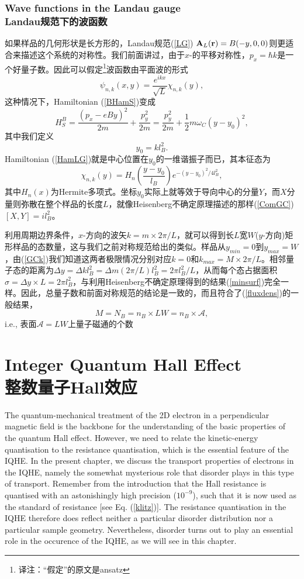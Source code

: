 \documentclass[10pt]{book}
\newcommand{\br}{{\bf r}}
\newcommand{\bA}{{\bf A}}
\newcommand{\Amath}{\mathcal{A}}
\newcommand{\beq}{\begin{equation}}
\newcommand{\eeq}{\end{equation}}
\begin{document}
\subsection[Landau规范下的波函数]{Wave functions in the Landau gauge\\\bf Landau规范下的波函数}
\label{WFLandau}

如果样品的几何形状是长方形的，Landau规范(\ref{LG}) $\bA_L(\br)=B(-y,0,0)$则更适合来描述这个系统的对称性。我们前面讲过，由于$x$-的平移对称性，$p_x=\hbar k$是一个好量子数。因此可以假定\footnote{译注：``假定''的原文是ansatz}波函数由平面波的形式
$$\psi_{n,k}(x,y) = \frac{e^{ikx}}{\sqrt{L}}\chi_{n,k}(y),
$$
这种情况下，Hamiltonian (\ref{BHamS})变成
\beq\label{HamLG}
H_S^B= \frac{(p_x- eBy)^2}{2m} + \frac{p_y^2}{2m} = \frac{p_y^2}{2m} + \frac{1}{2} m\omega_C (y-y_0)^2,
\eeq
其中我们定义
\beq\label{GCk}
y_0 = kl_B^2.
\eeq
Hamiltonian (\ref{HamLG})就是中心位置在$y_0$的一维谐振子而已，其本征态为
$$\chi_{n,k}(y)=H_n\left(\frac{y-y_0}{l_B}\right)e^{-(y-y_0)^2/4l_B^2},$$
其中$H_n(x)$为Hermite多项式\cite{CT}。坐标$y_0$实际上就等效于导向中心的分量$Y$，而$X$分量则弥散在整个样品的长度$L$，就像Heisenberg不确定原理描述的那样(\ref{ComGC})$[X,Y]=il_B^2$。

利用周期边界条件，$x$-方向的波矢$k=m\times 2\pi/L$，就可以得到长$L$宽$W$($y$-方向)矩形样品的态数量，这与我们之前对称规范给出的类似。样品从$y_{min}=0$到$y_{max}=W$，由(\ref{GCk})我们知道这两者极限情况分别对应$k=0$和$k_{max}=M \times 2\pi/L$。相邻量子态的距离为$\Delta y=\Delta k l_B^2=\Delta m (2\pi/L) l_B^2 = 2\pi l_B^2/L$，从而每个态占据面积$\sigma=\Delta y\times L=2\pi l_B^2$，与利用Heisenberg不确定原理得到的结果(\ref{minsurf})完全一样。因此，总量子数和前面对称规范的结论是一致的，而且符合了(\ref{fluxdens})的一般结果，
$$M=N_B= n_B\times LW = n_B \times \Amath,$$
i.e., 表面$\Amath=LW$上量子磁通的个数


\chapter[整数量子Hall效应]{Integer Quantum Hall Effect\\\bf 整数量子Hall效应}
\label{IQHE}


The quantum-mechanical treatment of the 2D electron in a perpendicular magnetic field is the backbone for the understanding of
the basic properties of the quantum Hall effect. However, we need to relate the kinetic-energy quantisation to the resistance 
quantisation, which is the essential feature of the IQHE. In the present chapter, we discuss the transport properties of 
electrons in the IQHE, namely the somewhat mysterious role that disorder plays in this type of transport. Remember from the
introduction that the Hall resistance is quantised with an astonishingly high precision ($10^{-9}$), such that it
is now used as the standard of resistance [see Eq. (\ref{klitz})]. The resistance quantisation in the IQHE therefore does reflect 
neither a particular disorder distribution nor a particular sample geometry. Nevertheless, disorder turns out to play an
essential role in the occurence of the IQHE, as we will see in this chapter. 
\end{document}
